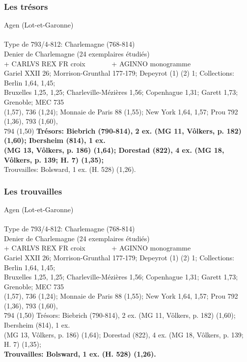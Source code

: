 \documentclass[10pt, compress]{beamer}
\begin{document}
\begin{frame}[fragile]
  \frametitle{Les trésors}
  \begin{scriptsize}
\textcolor{light_gray}{Agen (Lot-et-Garonne)}\\~\\

\textcolor{light_gray}{
Type de 793/4-812: Charlemagne (768-814)\\
Denier de Charlemagne (24 exemplaires étudiés)\\
+ CARLVS REX FR croix~~~~~~~ + AGINNO monogramme
}\\
\textcolor{light_gray}{
Gariel XXII 26; Morrison-Grunthal 177-179; Depeyrot (1) (2) 1;
Collections: Berlin 1,64, 1,45; \\
Bruxelles 1,25, 1,25; Charleville-Mézières 1,56; Copenhague 1,31; Garett 1,73; Grenoble; MEC 735 \\
(1,57), 736 (1,24); Monnaie de Paris 88 (1,55); New York 1,64, 1,57; Prou 792 (1,36), 793 (1,60), \\
794 (1,50) }\textbf{Trésors: Biebrich (790-814), 2 ex. (MG 11, Vôlkers, p. 182) (1,60); Ibersheim (814), 1 ex. \\
(MG 13, Vôlkers, p. 186) (1,64); Dorestad (822), 4 ex. (MG 18, Vôlkers, p. 139; H. 7) (1,35); }\\
\textcolor{light_gray}{
Trouvailles: Bolsward, 1 ex. (H. 528) (1,26).
} 
    \end{scriptsize}
\end{frame}

\begin{frame}[fragile]
  \frametitle{Les trouvailles}
  \begin{scriptsize}
\textcolor{light_gray}{Agen (Lot-et-Garonne)}\\~\\

\textcolor{light_gray}{
Type de 793/4-812: Charlemagne (768-814)\\
Denier de Charlemagne (24 exemplaires étudiés)\\
+ CARLVS REX FR croix~~~~~~~ + AGINNO monogramme
}\\
\textcolor{light_gray}{
Gariel XXII 26; Morrison-Grunthal 177-179; Depeyrot (1) (2) 1;
Collections: Berlin 1,64, 1,45; \\
Bruxelles 1,25, 1,25; Charleville-Mézières 1,56; Copenhague 1,31; Garett 1,73; Grenoble; MEC 735 \\
(1,57), 736 (1,24); Monnaie de Paris 88 (1,55); New York 1,64, 1,57; Prou 792 (1,36), 793 (1,60), \\
794 (1,50) Trésors: Biebrich (790-814), 2 ex. (MG 11, Vôlkers, p. 182) (1,60); Ibersheim (814), 1 ex. \\
(MG 13, Vôlkers, p. 186) (1,64); Dorestad (822), 4 ex. (MG 18, Vôlkers, p. 139; H. 7) (1,35); }\\
\textbf{Trouvailles: Bolsward, 1 ex. (H. 528) (1,26).}
    \end{scriptsize}
\end{frame}
\end{document}
